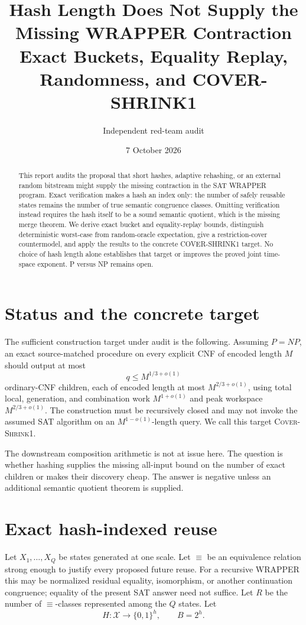 \documentclass[11pt]{article}
\title{Hash Length Does Not Supply the Missing WRAPPER Contraction\\
       Exact Buckets, Equality Replay, Randomness, and COVER-SHRINK1}
\author{Independent red-team audit}
\date{7 October 2026}
\newcommand{\E}{\mathrel{\equiv}}
\begin{document}
\maketitle

\begin{abstract}
This report audits the proposal that short hashes, adaptive rehashing, or an
external random bitstream might supply the missing contraction in the SAT
WRAPPER program.  Exact verification makes a hash an index only: the number
of safely reusable states remains the number of true semantic congruence
classes.  Omitting verification instead requires the hash itself to be a
sound semantic quotient, which is the missing merge theorem.  We derive exact
bucket and equality-replay bounds, distinguish deterministic worst-case from
random-oracle expectation, give a restriction-cover countermodel, and apply
the results to the concrete COVER-SHRINK1 target.  No choice of hash length
alone establishes that target or improves the proved joint time-space
exponent.  P versus NP remains open.
\end{abstract}

\section{Status and the concrete target}

The sufficient construction target under audit is the following.  Assuming
$P=NP$, an exact source-matched procedure on every explicit CNF of encoded
length $M$ should output at most
\[
 q\le M^{1/3+o(1)}
\]
ordinary-CNF children, each of encoded length at most
$M^{2/3+o(1)}$, using total local, generation, and combination work
$M^{1+o(1)}$ and peak workspace $M^{2/3+o(1)}$.  The construction must be
recursively closed and may not invoke the assumed SAT algorithm on an
$M^{1-o(1)}$-length query.  We call this target \textsc{Cover-Shrink1}.

The downstream composition arithmetic is not at issue here.  The question is
whether hashing supplies the missing all-input bound on the number of exact
children or makes their discovery cheap.  The answer is negative unless an
additional semantic quotient theorem is supplied.

\section{Exact hash-indexed reuse}

Let $X_1,\ldots,X_Q$ be states generated at one scale.  Let $\E$ be an
equivalence relation strong enough to justify every proposed future reuse.
For a recursive WRAPPER this may be normalized residual equality,
isomorphism, or another continuation congruence; equality of the present SAT
answer need not suffice.  Let $R$ be the number of $\E$-classes represented
among the $Q$ states.  Let
\[
 H:\mathcal X\longrightarrow\{0,1\}^h,
 \qquad B=2^h.
\]
\end{document}
